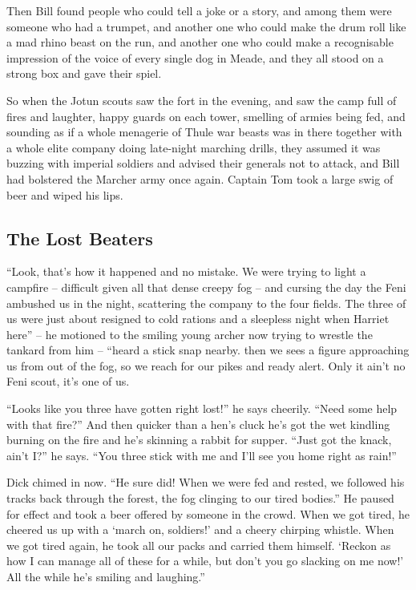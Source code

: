 Then Bill found people who could tell a joke or a story, and among them were someone who had a trumpet, and another one who could make the drum roll like a mad rhino beast on the run, and another one who could make a recognisable impression of the voice of every single dog in Meade, and they all stood on a strong box and gave their spiel.

So when the Jotun scouts saw the fort in the evening, and saw the camp full of fires and laughter, happy guards on each tower, smelling of armies being fed, and sounding as if a whole menagerie of Thule war beasts was in there together with a whole elite company doing late-night marching drills, they assumed it was buzzing with imperial soldiers and advised their generals not to attack, and Bill had bolstered the Marcher army once again.
Captain Tom took a large swig of beer and wiped his lips.

\subsection{The Lost Beaters}

“Look, that's how it happened and no mistake. We were trying to light a campfire – difficult given all that dense creepy fog – and cursing the day the Feni ambushed us in the night, scattering the company to the four fields. The three of us were just about resigned to cold rations and a sleepless night when Harriet here” -- he motioned to the smiling young archer now trying to wrestle the tankard from him – “heard a stick snap nearby. then we sees a figure approaching us from out of the fog, so we reach for our pikes and ready alert. Only it ain't no Feni scout, it's one of us.

“Looks like you three have gotten right lost!” he says cheerily. “Need some help with that fire?” And then quicker than a hen's cluck he's got the wet kindling burning on the fire and he's skinning a rabbit for supper. “Just got the knack, ain't I?” he says. “You three stick with me and I'll see you home right as rain!”

Dick chimed in now. “He sure did! When we were fed and rested, we followed his tracks back through the forest, the fog clinging to our tired bodies.” He paused for effect and took a beer offered by someone in the crowd. When we got tired, he cheered us up with a ‘march on, soldiers!’ and a cheery chirping whistle. When we got tired again, he took all our packs and carried them himself. ‘Reckon as how I can manage all of these for a while, but don't you go slacking on me now!’ All the while he's smiling and laughing.”

